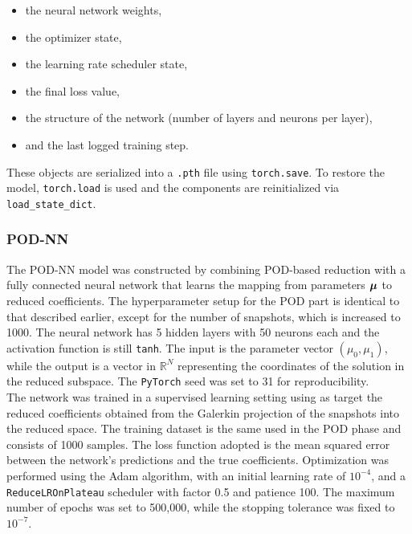 \documentclass[
    conference,
    nofonttune,
    11pt
]{IEEEtran}
\begin{document}
                \begin{itemize}
                  \item the neural network weights,
                  \item the optimizer state,
                  \item the learning rate scheduler state,
                  \item the final loss value,
                  \item the structure of the network (number of layers and neurons per layer),
                  \item and the last logged training step.
                \end{itemize}
                
                \noindent These objects are serialized into a \texttt{.pth} file using \texttt{torch.save}. To restore the model, \texttt{torch.load} is used and the components are reinitialized via \texttt{load\_state\_dict}.
                
            \subsubsection{POD-NN}
            
                The POD-NN model was constructed by combining POD-based reduction with a fully connected neural network that learns the mapping from parameters ${\boldsymbol\mu}$ to reduced coefficients. The hyperparameter setup for the POD part is identical to that described earlier, except for the number of snapshots, which is increased to 1000. The neural network has 5 hidden layers with 50 neurons each and the activation function is still \texttt{tanh}. The input is the parameter vector $(\mu_0, \mu_1)$, while the output is a vector in $\mathbb{R}^N$ representing the coordinates of the solution in the reduced subspace. The \texttt{PyTorch} seed was set to 31 for reproducibility.\\
                The network was trained in a supervised learning setting 
                using as target the reduced coefficients obtained from the Galerkin projection of the snapshots into the reduced space. The training dataset is the same used in the POD phase and consists of 1000 samples. The loss function adopted is the mean squared error between the network's predictions and the true coefficients. Optimization was performed using the Adam algorithm, with an initial learning rate of $10^{-4}$, and a \texttt{ReduceLROnPlateau} scheduler with factor 0.5 and patience 100. The maximum number of epochs was set to 500,000, while the stopping tolerance was fixed to $10^{-7}$.
                
\end{document}

